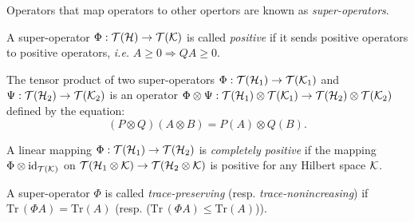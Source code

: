 

\begin{definition}
 Operators that map operators to other opertors are known as \emph{super-operators}. 
\end{definition}


\begin{definition} \label{def:positive_superoperator}
  A super-operator $\Phi: \mathcal{T}(\mathcal{H}) \to \mathcal{T}(\mathcal{K}) $ is called \emph{positive} if it sends positive operators to positive operators, \textit{i.e.} $A \geq 0 \Rightarrow{} Q A \geq 0$.
\end{definition}

\begin{definition}
  The tensor product of two super-operators $\Phi: \mathcal{T}(\mathcal{H}_1) \rightarrow \mathcal{T}(\mathcal{K}_1) $ and $\Psi : \mathcal{T}(\mathcal{H}_2) \rightarrow \mathcal{T}(\mathcal{K}_2)$ is an operator $ \Phi \otimes \Psi:  \mathcal{T}(\mathcal{H}_1) \otimes \mathcal{T}(\mathcal{K}_1) \rightarrow \mathcal{T}(\mathcal{H}_2) \otimes \mathcal{T}(\mathcal{K}_2)$ defined by the equation:
\begin{equation*}
  (P \otimes Q)(A \otimes B) = P (A) \otimes Q(B).
\end{equation*}
\end{definition}

\begin{definition} \label{def:completely_positive_superoperator}
  A linear mapping $ \Phi : \mathcal{T}(\mathcal{H}_1) \to \mathcal{T}(\mathcal{H}_2)$ is \emph{completely positive} if the mapping 
$\Phi \otimes \mathrm{id}_{\mathcal{T}(\mathcal{K})}$ on $\mathcal{T}(\mathcal{H}_1 \otimes \mathcal{K}) \to \mathcal{T}(\mathcal{H}_2 \otimes \mathcal{K}) $ is positive for any Hilbert space $\mathcal{K}$.
\end{definition}

\begin{definition} \label{def:trace_preserving_superoperator}
  A super-operator $\Phi$ is called \emph{trace-preserving} (resp. \emph{trace-nonincreasing}) if $\text{Tr} \hspace{2pt} (\Phi A)= \text{Tr} (A) $ (resp. ($\text{Tr} \hspace{2pt} (\Phi A)\leq \text{Tr} (A)$)).
\end{definition}


